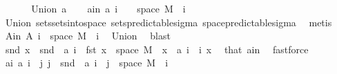 \begin{isabellebody}
\ \ \isacommand{{\isacharbraceright}{\kern0pt}}\isamarkupfalse%
\isanewline
{}\isamarkupfalse%
\isanewline
\ \ \isamarkupfalse%
\ {\isacharparenleft}{\kern0pt}Union\ a{\isacharparenright}{\kern0pt}\isanewline
\ \ \isamarkupfalse%
\ a{\isacharunderscore}{\kern0pt}in{\isacharcolon}{\kern0pt}\ {\isachardoublequoteopen}a\ i\ {\isasymsubseteq}\ {\isacharbraceleft}{\kern0pt}{}{\isachardot}{\kern0pt}{\isachardot}{\kern0pt}{\isacharbraceright}{\kern0pt}\ {\isasymtimes}\ space\ M{\isachardoublequoteclose}\ \ i\ \isamarkupfalse%
\ Union{\isacharparenleft}{\kern0pt}{}{\isacharparenright}{\kern0pt}\ sets{\isachardot}{\kern0pt}sets{\isacharunderscore}{\kern0pt}into{\isacharunderscore}{\kern0pt}space\ sets{\isacharunderscore}{\kern0pt}predictable{\isacharunderscore}{\kern0pt}sigma\ space{\isacharunderscore}{\kern0pt}predictable{\isacharunderscore}{\kern0pt}sigma\ \isamarkupfalse%
\ metis\isanewline
\ \ \isamarkupfalse%
\ A{\isacharunderscore}{\kern0pt}in{\isacharcolon}{\kern0pt}\ {\isachardoublequoteopen}A\ i\ {\isasymsubseteq}\ space\ M{\isachardoublequoteclose}\ \ i\ \isamarkupfalse%
\ Union{\isacharparenleft}{\kern0pt}{}{\isacharparenright}{\kern0pt}\ \isamarkupfalse%
\ blast\isanewline
\ \ \isamarkupfalse%
\ {\isachardoublequoteopen}snd\ x\ {\isasymin}\ snd\ {\isacharbackquote}{\kern0pt}\ {\isacharparenleft}{\kern0pt}a\ i\ {\isasyminter}\ {\isacharparenleft}{\kern0pt}{\isacharbraceleft}{\kern0pt}fst\ x{\isacharbraceright}{\kern0pt}\ {\isasymtimes}\ space\ M{\isacharparenright}{\kern0pt}{\isacharparenright}{\kern0pt}{\isachardoublequoteclose}\ \ {\isachardoublequoteopen}x\ {\isasymin}\ a\ i{\isachardoublequoteclose}\ \ i\ x\ \isamarkupfalse%
\ that\ a{\isacharunderscore}{\kern0pt}in\ \isamarkupfalse%
\ fastforce\isanewline
\ \ \isamarkupfalse%
\ a{\isacharunderscore}{\kern0pt}i{\isacharcolon}{\kern0pt}\ {\isachardoublequoteopen}a\ i\ {\isacharequal}{\kern0pt}\ {\isacharparenleft}{\kern0pt}{\isasymUnion}j{\isachardot}{\kern0pt}\ {\isacharbraceleft}{\kern0pt}j{\isacharbraceright}{\kern0pt}\ {\isasymtimes}\ {\isacharparenleft}{\kern0pt}snd\ {\isacharbackquote}{\kern0pt}\ {\isacharparenleft}{\kern0pt}a\ i\ {\isasyminter}\ {\isacharparenleft}{\kern0pt}{\isacharbraceleft}{\kern0pt}j{\isacharbraceright}{\kern0pt}\ {\isasymtimes}\ space\ M{\isacharparenright}{\kern0pt}{\isacharparenright}{\kern0pt}{\isacharparenright}{\kern0pt}{\isacharparenright}{\kern0pt}{\isachardoublequoteclose}\ \ i\ \isamarkupfalse%

\end{isabellebody}
